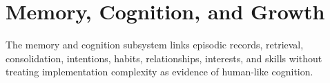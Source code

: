 \section{Memory, Cognition, and Growth}
The memory and cognition subsystem links episodic records, retrieval, consolidation, intentions, habits,
relationships, interests, and skills without treating implementation complexity as evidence of human-like
cognition.
